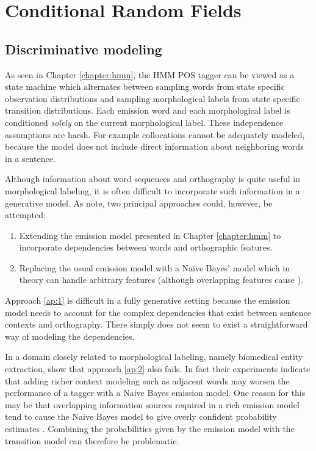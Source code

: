 \chapter{Conditional Random Fields}

\section{Discriminative modeling}

As seen in Chapter \ref{chapter:hmm}, the HMM POS tagger can be viewed
as a state machine which alternates between sampling words from state
specific observation distributions and sampling morphological labels
from state specific transition distributions. Each emission word and each
morphological label is conditioned {\it solely} on the current
morphological label. These independence assumptions are harsh. For example
collocations cannot be adequately modeled, because the model does not
include direct information about neighboring words in a sentence.

Although information about word sequences and orthography is quite
useful in morphological labeling, it is often difficult to incorporate
such information in a generative model. As \cite{Sutton2012} note, two
principal approaches could, however, be attempted:
\begin{enumerate}
\item Extending the emission model presented in Chapter
  \ref{chapter:hmm} to incorporate dependencies between words and
  orthographic features.\label{ap:1}
\item Replacing the usual emission model with a Naive
  Bayes' model which in theory can handle arbitrary
  features (although overlapping features cause ).\label{ap:2}
\end{enumerate}

Approach \ref{ap:1} is difficult in a fully generative setting because the
emission model needs to account for the complex dependencies that
exist between sentence contexts and orthography. There simply does not
seem to exist a straightforward way of modeling the dependencies.

In a domain closely related to morphological labeling, namely
biomedical entity extraction,\cite{Ruokolainen2013} show that approach
\ref{ap:2} also fails. In fact their experiments indicate that adding richer
context modeling such as adjacent words may worsen the performance of
a tagger with a Naive Bayes emission model. One reason for this may be
that overlapping information sources required in a rich emission model
tend to cause the Naive Bayes model to give overly confident
probability estimates \citep{Sutton2012}. Combining the probabilities
given by the emission model with the transition model can therefore be
problematic.

